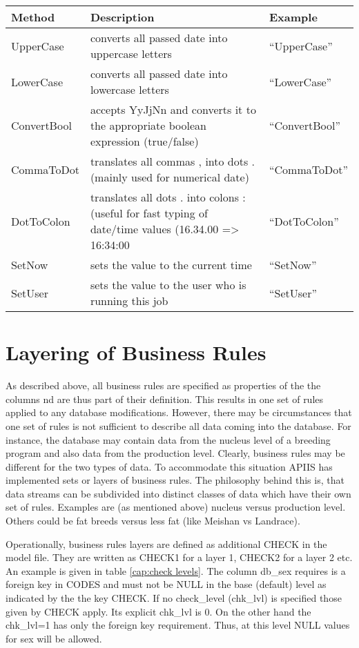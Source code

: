 \begin{center}\label{encode}\begin{tabular}{|l|p{80mm}|l|}
\hline 
\textbf{Method}&
\textbf{Description}&
\textbf{Example}\tabularnewline
\hline
\hline 
UpperCase&
converts all passed date into uppercase letters&
{}``UpperCase''\tabularnewline
\hline 
LowerCase&
converts all passed date into lowercase letters&
{}``LowerCase''\tabularnewline
\hline 
ConvertBool&
accepts YyJjNn and converts it to the appropriate boolean expression
(true/false)&
{}``ConvertBool''\tabularnewline
\hline 
CommaToDot&
translates all commas , into dots . (mainly used for numerical date)&
{}``CommaToDot''\tabularnewline
\hline 
DotToColon&
translates all dots . into colons : (useful for fast typing of date/time
values (16.34.00 => 16:34:00&
{}``DotToColon''\tabularnewline
\hline 
SetNow&
sets the value to the current time&
{}``SetNow''\tabularnewline
\hline
SetUser&
sets the value to the user who is running this job&
{}``SetUser''\tabularnewline
\hline
\end{tabular}\end{center}


\section{Layering of Business Rules}

As described above, all business rules are specified as properties
of the the columns nd are thus part of their definition. This results
in one set of rules applied to any database modifications. However,
there may be circumstances that one set of rules is not sufficient
to describe all data coming into the database. For instance, the database
may contain data from the nucleus level of a breeding program and
also data from the production level. Clearly, business rules may be
different for the two types of data. To accommodate this situation
APIIS has implemented sets or layers of business rules. The philosophy
behind this is, that data streams can be subdivided into distinct
classes of data which have their own set of rules. Examples are (as
mentioned above) nucleus versus production level. Others could be
fat breeds versus less fat (like Meishan vs Landrace).

Operationally, business rules layers are defined as additional CHECK
in the model file. They are written as CHECK1 for a
layer 1, CHECK2 for a layer 2 etc. An example is given
in table \ref{cap:check levels}. The column db\_sex requires is a
foreign key in CODES and must not be NULL in the base (default) level
as indicated by the the key CHECK. If no check\_level (chk\_lvl)
is specified those given by CHECK apply. Its explicit chk\_lvl is
0. On the other hand the chk\_lvl=1 has only the foreign key requirement.
Thus, at this level NULL values for sex will be allowed. 


